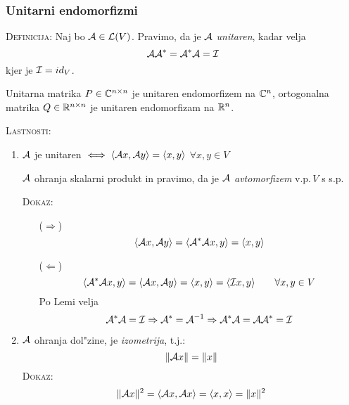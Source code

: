 \subsubsection{Unitarni endomorfizmi}
\textsc{Definicija:} Naj bo $\mathcal{A} \in \mathcal{L}(V)$. Pravimo, da je $\mathcal{A}$ \emph{unitaren}, kadar velja
\begin{equation*}
\mathcal{A} \mathcal{A}^* = \mathcal{A}^* \mathcal{A}= \mathcal{I}
\end{equation*}
kjer je $\mathcal{I} = id_V$.

Unitarna matrika $P \in \mathbb{C}^{n \times n}$ je unitaren endomorfizem na $\mathbb{C}^n$, ortogonalna matrika $Q \in \mathbb{R}^{n \times n}$ je unitaren endomorfizam na $\mathbb{R}^n$.

\textsc{Lastnosti:}
\begin{enumerate}
    \item $\mathcal{A}$ je unitaren $\iff \langle \mathcal{A} x, \mathcal{A} y \rangle = \langle x, y \rangle$ \hfill $\forall x, y \in V$
    
    $\mathcal{A}$ ohranja skalarni produkt in pravimo, da je $\mathcal{A}$ \emph{avtomorfizem} v.p.\,$V$ s s.p.
    
    \textsc{Dokaz:}
    \begin{itemize}
        \item[($\Rightarrow$)]
        \begin{equation*}
        \langle \mathcal{A} x, \mathcal{A} y \rangle = \langle \mathcal{A}^* \mathcal{A} x, y \rangle = \langle x, y \rangle
        \end{equation*}
        
        \item[($\Leftarrow$)]
        \begin{equation*}
        \langle \mathcal{A}^* \mathcal{A} x, y \rangle = \langle \mathcal{A} x, \mathcal{A} y \rangle = \langle x, y \rangle = \langle \mathcal{I} x, y \rangle \qquad \forall x, y \in V
        \end{equation*}
        Po Lemi velja
        \begin{equation*}
        \mathcal{A}^* \mathcal{A} = \mathcal{I} \Rightarrow \mathcal{A}^* = \mathcal{A}^{-1} \Rightarrow \mathcal{A}^* \mathcal{A} = \mathcal{A} \mathcal{A}^* = \mathcal{I}
        \end{equation*}
    \end{itemize}

    \item $\mathcal{A}$ ohranja dol"zine, je \emph{izometrija}, t.j.:
    \begin{equation*}
    \| \mathcal{A} x \| = \| x \|
    \end{equation*}
    \textsc{Dokaz:}
    \begin{equation*}
    \| \mathcal{A} x \|^2 = \langle \mathcal{A} x, \mathcal{A} x \rangle = \langle x, x \rangle = \| x \|^2
    \end{equation*}
    

\end{enumerate}

